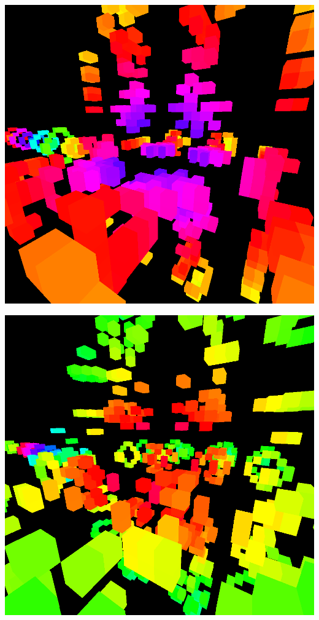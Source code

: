 \documentclass[11pt]{article}
\begin{document}
\begin{center}
\includegraphics[width=.9\linewidth]{6.png}
\end{center}

\begin{center}
\includegraphics[width=.9\linewidth]{7.png}
\end{center}
\end{document}
